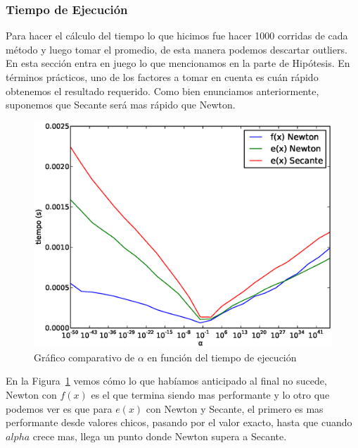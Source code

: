 
\subsubsection{Tiempo de Ejecución} %
\label{ssub:tiempo_de_ejecuci_n}

Para hacer el cálculo del tiempo lo que hicimos fue hacer 1000 corridas de cada método y luego tomar el promedio, de esta manera podemos descartar outliers. En esta sección entra en juego lo que mencionamos en la parte de Hipótesis. En términos prácticos, uno de los factores a tomar en cuenta es cuán rápido obtenemos el resultado requerido. Como bien enunciamos anteriormente, suponemos que Secante será mas rápido que Newton.

\begin{figure}[!htbp]
  \begin{center}
    \includegraphics[scale=0.5]{graficos/new/comparacion_tiempos.eps}
    \caption{\label{fig:comparacion_tiempos} Gráfico comparativo de $\alpha$ en función del tiempo de ejecución}
  \end{center}
\end{figure}

En la Figura~\ref{fig:comparacion_tiempos} vemos cómo lo que habíamos anticipado al final no sucede, Newton con $f(x)$ es el que termina siendo mas performante y lo otro que podemos ver es que para $e(x)$ con Newton y Secante, el primero es mas performante desde valores chicos, pasando por el valor exacto, hasta que cuando $alpha$ crece mas, llega un punto donde Newton supera a Secante.

